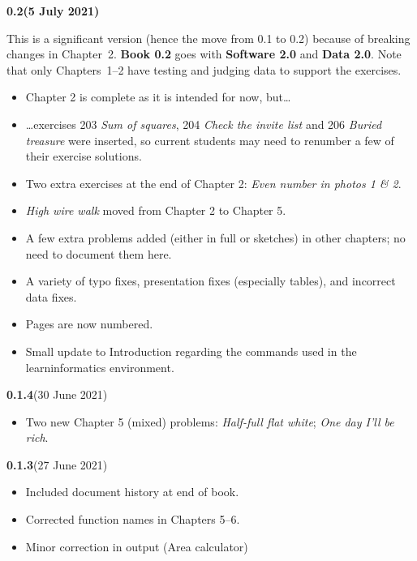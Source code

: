 

{
\small

\newcommand{\versionmarker}[2]{\textbf{#1}\quad(#2)}
\newcommand{\versionmarkerspecial}[2]{{\color{BrickRed}\bfseries#1\quad(#2)}}

\versionmarkerspecial{0.2}{5 July 2021}

This is a significant version (hence the move from 0.1 to 0.2) because of breaking changes
in Chapter~2. \textbf{Book 0.2} goes with \textbf{Software 2.0} and \textbf{Data 2.0}.
Note that only Chapters~1--2 have testing and judging data to support the exercises.

\begin{itemize}
  \item Chapter 2 is complete as it is intended for now, but\dots
  \item \dots exercises 203 \emph{Sum of squares}, 204 \emph{Check the invite list} and 206
    \emph{Buried treasure} were inserted, so current students may need to renumber a few
    of their exercise solutions.
  \item Two extra exercises at the end of Chapter 2: \emph{Even number in photos 1 \& 2}.
  \item \emph{High wire walk} moved from Chapter 2 to Chapter 5.
  \item A few extra problems added (either in full or sketches) in other chapters; no need
    to document them here.
  \item A variety of typo fixes, presentation fixes (especially tables), and incorrect
    data fixes.
  \item Pages are now numbered.
  \item Small update to Introduction regarding the commands used in the
    \textsf{learninformatics} environment.
\end{itemize}

\versionmarker{0.1.4}{30 June 2021}
\begin{itemize}
  \item Two new Chapter 5 (mixed) problems: \emph{Half-full flat white};
    \emph{One day I'll be rich}.
\end{itemize}

\versionmarker{0.1.3}{27 June 2021}
\begin{itemize}
  \item Included document history at end of book.
  \item Corrected function names in Chapters 5--6.
  \item Minor correction in output (Area calculator)
\end{itemize}

}
